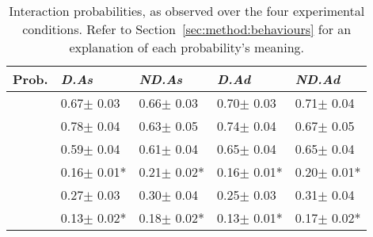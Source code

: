 \begin{table}[t]
    \caption{Interaction probabilities, as observed over the four experimental conditions. Refer to Section~\ref{sec:method:behaviours} for an explanation of each probability's meaning.\vspace*{-3mm}}
    \label{tbl_probabilities}
    \renewcommand{\arraystretch}{1.4}
    \begin{center}
    \begin{small}
    \begin{tabulary}{\textwidth}{L{1.2cm}||D{1.35cm}|D{1.35cm}|D{1.35cm}|D{1.35cm}}
    \hline
    
    \textbf{Prob.} & \textbf{\emph{D.As}} & \textbf{\emph{ND.As}} & \textbf{\emph{D.Ad}} & \textbf{\emph{ND.Ad}} \\ \hline\hline
    
     & 0.67$\pm$ 0.03 & 0.66$\pm$ 0.03 & 0.70$\pm$ 0.03 & 0.71$\pm$ 0.04 \\ \hline
     & 0.78$\pm$ 0.04 & 0.63$\pm$ 0.05 & 0.74$\pm$ 0.04 & 0.67$\pm$ 0.05 \\ \hline
     & 0.59$\pm$ 0.04 & 0.61$\pm$ 0.04 & 0.65$\pm$ 0.04 & 0.65$\pm$ 0.04 \\ \hline\hline
     & 0.16$\pm$ 0.01* & 0.21$\pm$ 0.02* & 0.16$\pm$ 0.01* & 0.20$\pm$ 0.01* \\ \hline
     & 0.27$\pm$ 0.03 & 0.30$\pm$ 0.04 & 0.25$\pm$ 0.03 & 0.31$\pm$ 0.04 \\ \hline
     & 0.13$\pm$ 0.02* & 0.18$\pm$ 0.02* & 0.13$\pm$ 0.01* & 0.17$\pm$ 0.02* \\ \hline
    \end{tabulary}
    \end{small}
    \vspace*{-3mm}
    \end{center}
\end{table}

